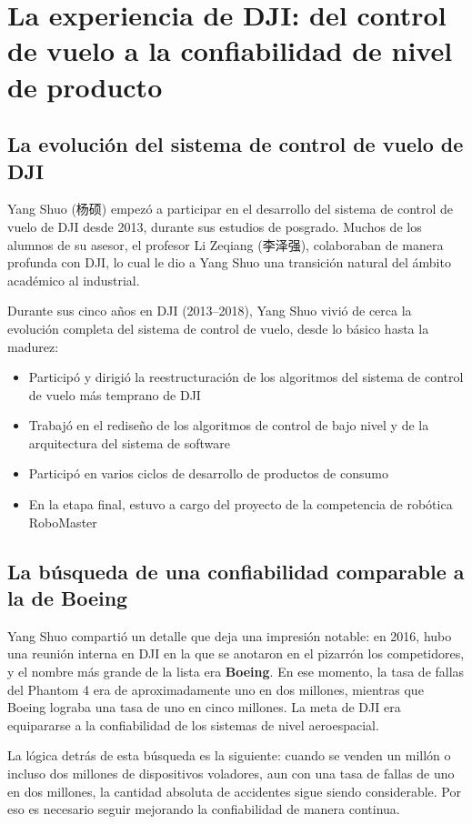 \section{La experiencia de DJI: del control de vuelo a la confiabilidad de nivel de producto}

\subsection{La evolución del sistema de control de vuelo de DJI}

Yang Shuo (杨硕) empezó a participar en el desarrollo del sistema de control de vuelo de DJI desde 2013, durante sus estudios de posgrado. Muchos de los alumnos de su asesor, el profesor Li Zeqiang (李泽强), colaboraban de manera profunda con DJI, lo cual le dio a Yang Shuo una transición natural del ámbito académico al industrial.

Durante sus cinco años en DJI (2013--2018), Yang Shuo vivió de cerca la evolución completa del sistema de control de vuelo, desde lo básico hasta la madurez:
\begin{itemize}
    \item Participó y dirigió la reestructuración de los algoritmos del sistema de control de vuelo más temprano de DJI
    \item Trabajó en el rediseño de los algoritmos de control de bajo nivel y de la arquitectura del sistema de software
    \item Participó en varios ciclos de desarrollo de productos de consumo
    \item En la etapa final, estuvo a cargo del proyecto de la competencia de robótica RoboMaster
\end{itemize}

\subsection{La búsqueda de una confiabilidad comparable a la de Boeing}

Yang Shuo compartió un detalle que deja una impresión notable: en 2016, hubo una reunión interna en DJI en la que se anotaron en el pizarrón los competidores, y el nombre más grande de la lista era \textbf{Boeing}. En ese momento, la tasa de fallas del Phantom 4 era de aproximadamente uno en dos millones, mientras que Boeing lograba una tasa de uno en cinco millones. La meta de DJI era equipararse a la confiabilidad de los sistemas de nivel aeroespacial.

La lógica detrás de esta búsqueda es la siguiente: cuando se venden un millón o incluso dos millones de dispositivos voladores, aun con una tasa de fallas de uno en dos millones, la cantidad absoluta de accidentes sigue siendo considerable. Por eso es necesario seguir mejorando la confiabilidad de manera continua.

